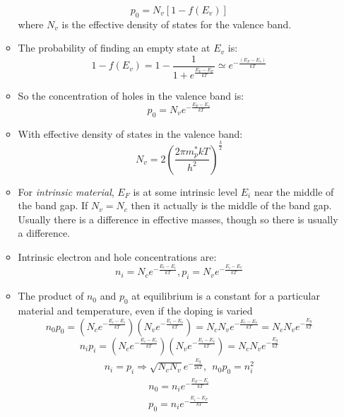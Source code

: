 \documentclass{article}
\begin{document}
\begin{itemize}
\begin{itemize}
    \begin{equation}p_0 = N_v[1 - f(E_v)]\end{equation}
      where $N_v$ is the effective density of states for the valence band.
    \item The probability of finding an empty state at $E_v$ is$:$
      \begin{equation}1 - f(E_v) = 1 - \frac{1}{1 + e^{\frac{E_V - E_F}{kT}}} \simeq e^{-\frac{(E_F - E_v)}{kT}} \end{equation}
    \item So the concentration of holes in the valence band is$:$
      \begin{equation}p_0 = N_ve^{-\frac{E_F-E_v}{kT}} \end{equation}
    \item With effective density of states in the valence band$:$
      \begin{equation}N_v = 2(\frac{2\pi m_p^{*}kT}{h^2})^{\frac{3}{2}} \end{equation}
    \item For \textit{intrinsic material}, $E_F$ is at some intrinsic level $E_i$ near the middle of the band gap.  If $N_v = N_c$ then it actually is the middle of the band gap.  Usually there is a difference in effective masses, though so there is usually a difference.  
    \item Intrinsic electron and hole concentrations are$:$
      \begin{equation} n_i = N_ce^{-\frac{E_c - E_i}{kT}}, p_i = N_ve^{-\frac{E_i - E_v}{kT}} \end{equation}
    \item The product of $n_0$ and $p_0$ at equilibrium is a constant for a particular material and temperature, even if the doping is varied
      \begin{equation} n_0p_0 = (N_ce^{-\frac{E_c - E_i}{kT}})(N_ve^{-\frac{E_i - E_v}{kT}}) = N_cN_ve^{-\frac{E_c - E_v}{kT}}= N_cN_ve^{-\frac{E_g}{kT}}\end{equation}
      \begin{equation} n_ip_i =  (N_ce^{-\frac{E_c - E_i}{kT}})(N_ve^{-\frac{E_i - E_v}{kT}}) = N_cN_ve^{-\frac{E_g}{kT}} \end{equation}
      \begin{align}\boxed{n_i=p_i \Rightarrow \sqrt{N_cN_v}e^{-\frac{E_g}{2kT}},~~ n_0p_0  = n_i^2} \end{align}
      \begin{align}
        \boxed{n_0 = n_ie^{-\frac{E_F - E_i}{kT}}} \\ \boxed{p_0 = n_ie^{-\frac{E_i - E_F}{kT}}} 
      \end{align}
  \end{itemize}
\end{itemize}
\end{document}
